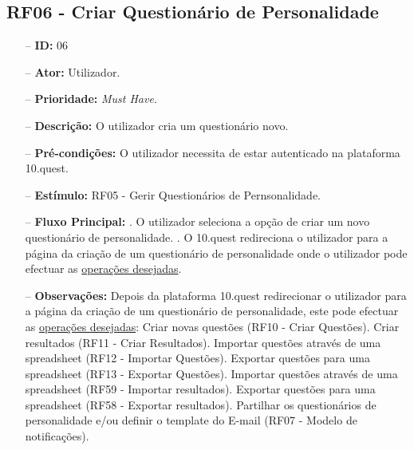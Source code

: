 \subsection{RF06 - Criar Questionário de Personalidade}
\begin{itemize}
	\item[--] \textbf{ID:} 06
	\item[--]  \textbf{Ator:} Utilizador.
	\item[--]  \textbf{Prioridade:} \textit{Must Have}.
	\item[--]  \textbf{Descrição:} O utilizador cria um questionário novo.
	\item[--]  \textbf{Pré-condições:} O utilizador necessita de estar autenticado na plataforma 10.quest.
	\item[--]  \textbf{Estímulo:} RF05 - Gerir Questionários de Pernsonalidade.
	\item[--]  \textbf{Fluxo Principal:} 
		. O utilizador seleciona a opção de criar um novo questionário de personalidade.
		. O 10.quest redireciona o utilizador para a página da criação de um questionário de personalidade onde o utilizador pode efectuar as \underline{operações desejadas}.
	\item[--]  \textbf{Observações:} Depois da plataforma 10.quest redirecionar o utilizador para a página da criação de um questionário de personalidade, este pode efectuar as \underline{operações desejadas}:
		\subitem Criar novas questões (RF10 - Criar Questões).
		\subitem Criar resultados (RF11 - Criar Resultados).
		\subitem Importar questões através de uma spreadsheet (RF12 - Importar Questões).
		\subitem Exportar questões para uma spreadsheet (RF13 - Exportar Questões).
		\subitem Importar questões através de uma spreadsheet (RF59 - Importar resultados).
		\subitem Exportar questões para uma spreadsheet (RF58 - Exportar resultados).
		\subitem Partilhar os questionários de personalidade e/ou definir o template do E-mail (RF07 - Modelo de notificações).
\end{itemize}
\newpage

